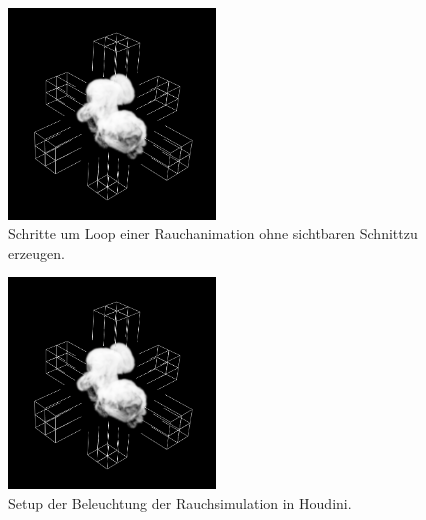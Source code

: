 \begin{figure}[h!]
    \includegraphics[width=0.49\textwidth]{Grafiken/Implementation/Lightmaps/Smoke_LightSetup.png}
	\centering
    \begin{footnotesize}
        \caption{Schritte um Loop einer Rauchanimation ohne sichtbaren Schnittzu erzeugen. }
		\label{fig:lightSetup}
    \end{footnotesize}
\end{figure}



\begin{figure}[h!]
    \includegraphics[width=0.49\textwidth]{Grafiken/Implementation/Lightmaps/Smoke_LightSetup.png}
	\centering
    \begin{footnotesize}
        \caption{Setup der Beleuchtung der Rauchsimulation in Houdini.}
		\label{fig:lightSetup}
    \end{footnotesize}
\end{figure}


